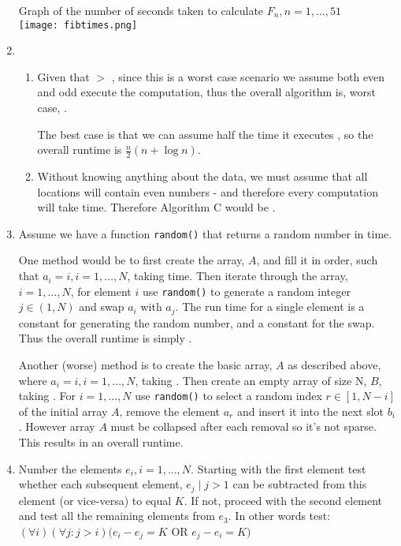 \documentclass[12pt]{chmullighw}
\begin{document}
\begin{enumerate}
Graph of the number of seconds taken to calculate $F_n, n=1,...,51$ \\
\texttt{[image: fibtimes.png]}


\item
    \begin{enumerate}
    \item  Given that  $>$ , since this is a worst case scenario
we assume both even and odd execute the  computation, thus the overall
algorithm is, worst case, .

    The best case is that we can assume half the time it executes ,
    so the overall runtime is $\frac{n}{2}(n + \log n)$.
    \item Without knowing anything about the data, we must assume that all locations
    will contain even numbers - and therefore every computation will take  time. Therefore
    Algorithm C would be .
    \end{enumerate}

\item Assume we have a function \texttt{random()} that returns a random number
in  time.

One method would be to first create the array, $A$, and fill it in order, such that
$a_i = i, i = 1,\ldots,N$, taking  time.
Then iterate through the array, $i = 1,\ldots,N$, for element
$i$ use \texttt{random()} to generate a random integer $j \in (1, N)$ and swap
$a_i$ with $a_j$. The run time for a single element is a constant for generating
the random number, and a constant for the swap. Thus the overall runtime is
simply .

Another (worse) method is to create the basic array, $A$ as described above, where
$a_i = i, i=1,\ldots,N$, taking . Then create an empty array of size N,
$B$, taking . For $i = 1,\ldots,N$ use \texttt{random()} to select a
random index $r \in [1, N-i]$ of the initial array $A$, remove the element $a_r$
and insert it into the next slot $b_i$. However array $A$ must be collapsed after
each removal so it's not sparse. This results in an overall  runtime.


\item Number the elements $e_i, i=1,...,N$. Starting with the first element test
whether each subsequent element, $e_j \mid j > 1$ can be subtracted from this element (or
vice-versa) to equal $K$. If not, proceed with the second element and test all
the remaining elements from $e_3$. In other words test:\\
$(\forall i)(\forall j : j > i)(e_i - e_j = K$ OR $e_j - e_i = K)$


\end{enumerate}
\end{document}
